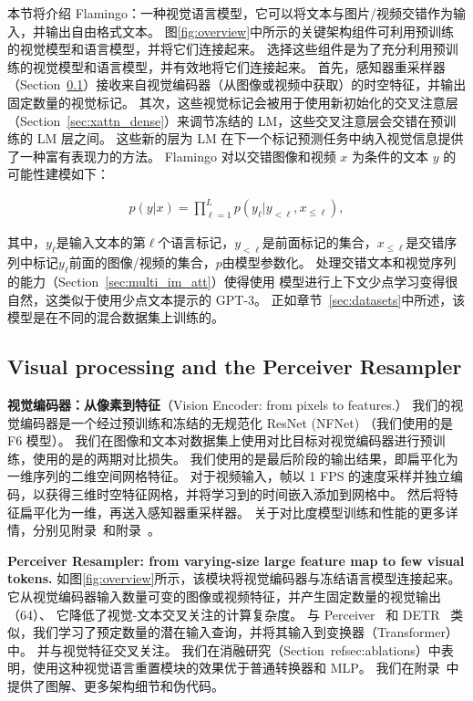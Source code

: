 本节将介绍 Flamingo：一种视觉语言模型，它可以将文本与图片/视频交错作为输入，并输出自由格式文本。%
图\ref{fig:overview}中所示的关键架构组件可利用预训练的视觉模型和语言模型，并将它们连接起来。
选择这些组件是为了充分利用预训练的视觉模型和语言模型，并有效地将它们连接起来。
首先，感知器重采样器（Section~\ref{sec:transformer_resampler}）接收来自视觉编码器（从图像或视频中获取）的时空特征，并输出固定数量的视觉标记。
其次，这些视觉标记会被用于使用新初始化的交叉注意层（Section~\ref{sec:xattn_dense}）来调节冻结的 LM，这些交叉注意层会交错在预训练的 LM 层之间。
这些新的层为 LM 在下一个标记预测任务中纳入视觉信息提供了一种富有表现力的方法。%
Flamingo 对以交错图像和视频 $x$ 为条件的文本 $y$ 的可能性建模如下：


\begin{align}
    p(y | x) = \prod_{\ell=1}^L p(y_\ell | y_{< \ell}, x_{\leq \ell}),
    \label{eq:modeling}
\end{align}

其中，$y_{\ell}$是输入文本的第$\ell$个语言标记，$y_{<\ell}$是前面标记的集合，$x_{\leq \ell}$是交错序列中标记$y_{\ell}$前面的图像/视频的集合，$p$由\method{}模型参数化。
处理交错文本和视觉序列的能力（Section~\ref{sec:multi_im_att}）使得使用 \method{}模型进行上下文少点学习变得很自然，这类似于使用少点文本提示的 GPT-3。
正如章节~\ref{sec:datasets}中所述，该模型是在不同的混合数据集上训练的。




\subsection{Visual processing and the Perceiver Resampler}
\label{sec:transformer_resampler}

\noindent
\textbf{视觉编码器：从像素到特征}（Vision Encoder: from pixels to features.）
我们的视觉编码器是一个经过预训练和冻结的无规范化 ResNet (NFNet) （我们使用的是 F6 模型）。
我们在图像和文本对数据集上使用对比目标对视觉编码器进行预训练，使用的是\citet{clip}的两期对比损失。
我们使用的是最后阶段的输出结果，即扁平化为一维序列的二维空间网格特征。
对于视频输入，帧以 1 FPS 的速度采样并独立编码，以获得三维时空特征网格，并将学习到的时间嵌入添加到网格中。
然后将特征扁平化为一维，再送入感知器重采样器。
关于对比度模型训练和性能的更多详情，分别见附录~和附录~。

\noindent
\textbf{Perceiver Resampler: from varying-size large feature map to few visual tokens.} 
如图\ref{fig:overview}所示，该模块将视觉编码器与冻结语言模型连接起来。
它从视觉编码器输入数量可变的图像或视频特征，并产生固定数量的视觉输出（64）、
它降低了视觉-文本交叉关注的计算复杂度。
与 Perceiver~\citep{jaegle2021perceiver} 和 DETR~\citep{carion2020end} 类似，我们学习了预定数量的潜在输入查询，并将其输入到变换器（Transformer）中。
并与视觉特征交叉关注。
我们在消融研究（Section~ref{sec:ablations}）中表明，使用这种视觉语言重置模块的效果优于普通转换器和 MLP。
我们在附录~中提供了图解、更多架构细节和伪代码。


